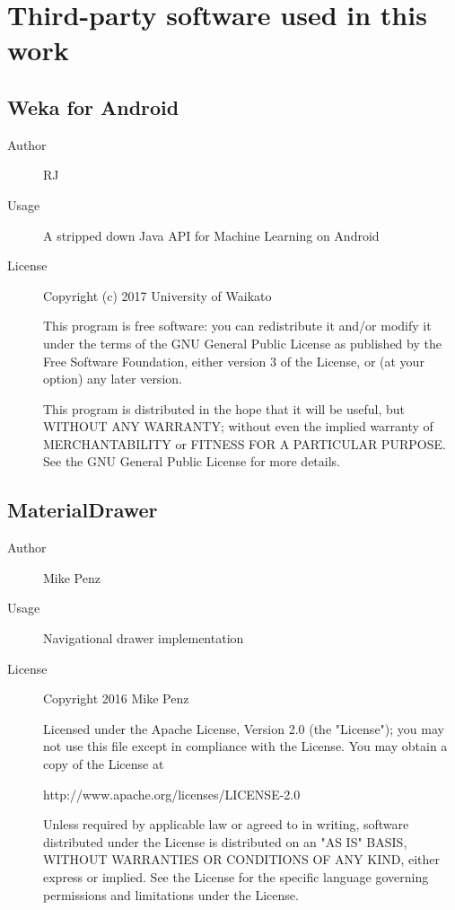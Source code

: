 \chapter{Third-party software used in this work}
\label{chapter:third-party-software}

\section*{Weka for Android}
\begin{description}
    \item[Author] RJ
    \item[Usage] A stripped down Java API for Machine Learning on Android
    \item[License]  Copyright (c) 2017  University of Waikato

    This program is free software: you can redistribute it and/or modify
    it under the terms of the GNU General Public License as published by
    the Free Software Foundation, either version 3 of the License, or
    (at your option) any later version.

    This program is distributed in the hope that it will be useful,
    but WITHOUT ANY WARRANTY; without even the implied warranty of
    MERCHANTABILITY or FITNESS FOR A PARTICULAR PURPOSE.  See the
    GNU General Public License for more details.
\end{description}

\section*{MaterialDrawer}
\begin{description}
    \item[Author] Mike Penz
    \item[Usage] Navigational drawer implementation
    \item[License] \scriptsize Copyright 2016 Mike Penz
      
    Licensed under the Apache License, Version 2.0 (the "License");
you may not use this file except in compliance with the License.
You may obtain a copy of the License at

   http://www.apache.org/licenses/LICENSE-2.0

Unless required by applicable law or agreed to in writing, software
distributed under the License is distributed on an "AS IS" BASIS,
WITHOUT WARRANTIES OR CONDITIONS OF ANY KIND, either express or implied.
See the License for the specific language governing permissions and
limitations under the License.
      
\end{description}

